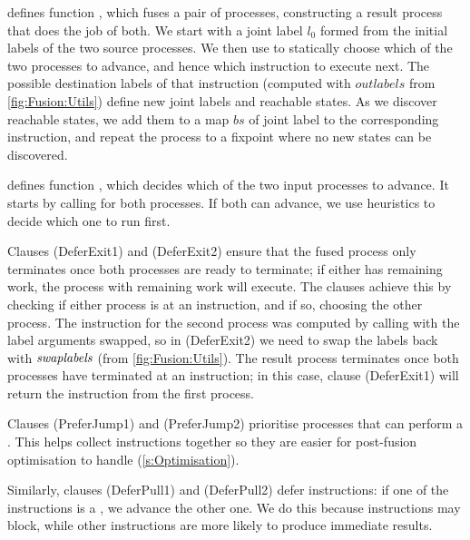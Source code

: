 



\smallskip
 defines function , which fuses a pair of processes, constructing a result process that does the job of both. We start with a joint label $l_0$ formed from the initial labels of the two source processes. We then use  to statically choose which of the two processes to advance, and hence which instruction to execute next. The possible destination labels of that instruction (computed with $outlabels$ from \cref{fig:Fusion:Utils}) define new joint labels and reachable states. As we discover reachable states, we add them to a map $bs$ of joint label to the corresponding instruction, and repeat the process to a fixpoint where no new states can be discovered.



 defines function , which decides which of the two input processes to advance. It starts by calling  for both processes. If both can advance, we use heuristics to decide which one to run first.

Clauses (DeferExit1) and (DeferExit2) ensure that the fused process only terminates once both processes are ready to terminate; if either has remaining work, the process with remaining work will execute.
The clauses achieve this by checking if either process is at an \lstiproc@exit@ instruction, and if so, choosing the other process.
The instruction for the second process was computed by calling  with the label arguments swapped, so in (DeferExit2) we need to swap the labels back with $\textit{swaplabels}$ (from \cref{fig:Fusion:Utils}).
The result process terminates once both processes have terminated at an \lstiproc@exit@ instruction; in this case, clause (DeferExit1) will return the \lstiproc@exit@ instruction from the first process.

Clauses (PreferJump1) and (PreferJump2) prioritise processes that can perform a \lstiproc@jump@.
This helps collect \lstiproc@jump@ instructions together so they are easier for post-fusion optimisation to handle (\cref{s:Optimisation}).

Similarly, clauses (DeferPull1) and (DeferPull2) defer \lstiproc@pull@ instructions: if one of the instructions is a \lstiproc@pull@, we advance the other one. We do this because \lstiproc@pull@ instructions may block, while other instructions are more likely to produce immediate results.

